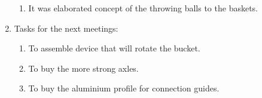 \begin{enumerate}
\begin{enumerate}
      \item It was elaborated concept of the throwing balls to the baskets.
    \end{enumerate}
    
	\item Tasks for the next meetings:
	\begin{enumerate}
	  \item To assemble device that will rotate the bucket.
	  
	  \item To buy the more strong axles.
	  
	  \item To buy the aluminium profile for connection guides.
    \end{enumerate}     
\end{enumerate}
\fillpage
